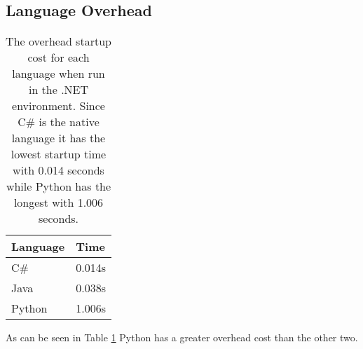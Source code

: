 \subsection{Language Overhead} \label{subsec:language_overhead}

\begin{table}[h]
	\begin{center}
		\begin{tabular} { >{\centering\arraybackslash}m{3cm} | >{\centering\arraybackslash}m{2cm}}
			\hline
			\textbf{Language}	& \textbf{Time} \\ \hline
			C\#					& 0.014s \\ \hline
			Java				& 0.038s \\ \hline
			Python				& 1.006s \\ \hline
		\end{tabular}
	\end{center}
	\caption{The overhead startup cost for each language when run in the .NET environment. Since C\# is the native language it has the lowest startup time with 0.014 seconds while Python has the longest with 1.006 seconds.}
	\label{table:language_overhead}
\end{table}

As can be seen in Table \ref{table:language_overhead} Python has a greater overhead cost than the other two.
